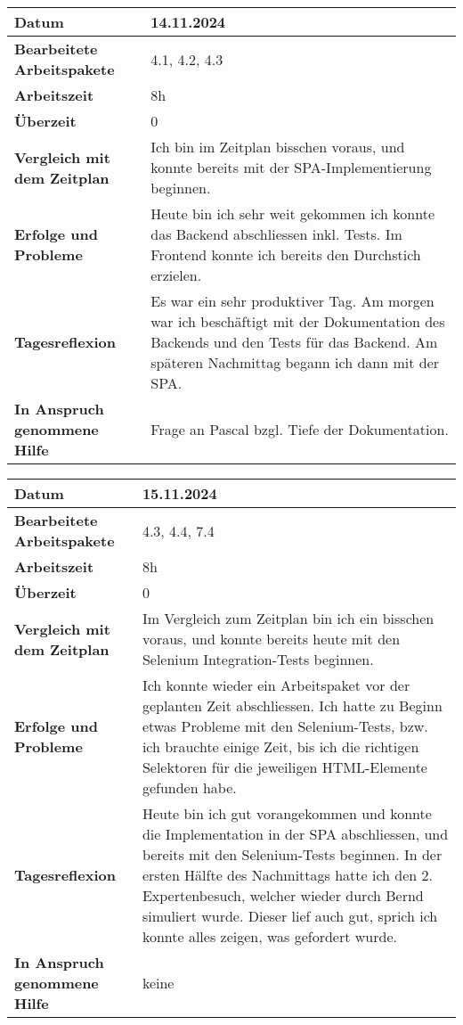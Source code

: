 \begin{longtable}{p{}|p{}}
	\hline
	\textbf{Datum}                       & 14.11.2024 \\
	\hline
	\textbf{Bearbeitete Arbeitspakete}   & 4.1, 4.2, 4.3 \\
	\hline
	\textbf{Arbeitszeit}                 & 8h \\
	\hline
	\textbf{Überzeit}                    & 0 \\
	\hline
	\textbf{Vergleich mit dem Zeitplan}  & Ich bin im Zeitplan bisschen voraus, und konnte bereits mit der SPA-Implementierung beginnen.\\
	\hline
	\textbf{Erfolge und Probleme}        & Heute bin ich sehr weit gekommen ich konnte das Backend abschliessen inkl. Tests. Im Frontend konnte ich bereits den Durchstich erzielen.
	\\
	\hline
	\textbf{Tagesreflexion}              & Es war ein sehr produktiver Tag. Am morgen war ich beschäftigt mit der Dokumentation des Backends und den Tests für das Backend. Am späteren Nachmittag begann ich dann mit der SPA.
	\\
	\hline
	\textbf{In Anspruch genommene Hilfe} & Frage an Pascal bzgl. Tiefe der Dokumentation. \\
	\hline
\end{longtable}\label{tab:arbeitsprotokoll-tag6}
\newpage

\begin{longtable}{p{}|p{}}
	\hline
	\textbf{Datum}                       & 15.11.2024 \\
	\hline
	\textbf{Bearbeitete Arbeitspakete}   & 4.3, 4.4, 7.4 \\
	\hline
	\textbf{Arbeitszeit}                 & 8h \\
	\hline
	\textbf{Überzeit}                    & 0 \\
	\hline
	\textbf{Vergleich mit dem Zeitplan}  & Im Vergleich zum Zeitplan bin ich ein bisschen voraus, und konnte bereits heute mit den Selenium Integration-Tests beginnen.\\
	\hline
	\textbf{Erfolge und Probleme}        & Ich konnte wieder ein Arbeitspaket vor der geplanten Zeit abschliessen. Ich hatte zu Beginn etwas Probleme mit den Selenium-Tests, bzw. ich brauchte einige Zeit, bis ich die richtigen Selektoren für die jeweiligen HTML-Elemente gefunden habe.
	\\
	\hline
	\textbf{Tagesreflexion}              & Heute bin ich gut vorangekommen und konnte die Implementation in der SPA abschliessen, und bereits mit den Selenium-Tests beginnen. In der ersten Hälfte des Nachmittags hatte ich den 2. Expertenbesuch, welcher wieder durch Bernd simuliert wurde. Dieser lief auch gut, sprich ich konnte alles zeigen, was gefordert wurde.
	\\
	\hline
	\textbf{In Anspruch genommene Hilfe} & keine\\
	\hline
\end{longtable}\label{tab:arbeitsprotokoll-tag7}
\newpage

